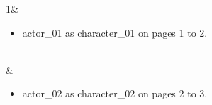 1&\begin{itemize}
\item actor\_01 as character\_01 on pages 1 to 2.\end{itemize}
\\&\begin{itemize}
\item actor\_02 as character\_02 on pages 2 to 3.\end{itemize}
\\\hline
